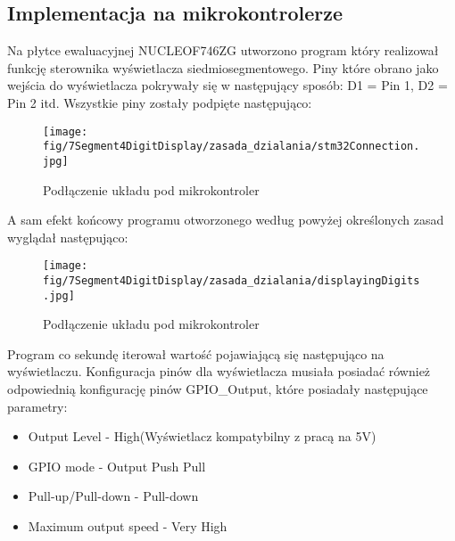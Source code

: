 \documentclass[11pt, a4paper]{article}
\begin{document}
\subsection{Implementacja na mikrokontrolerze}
Na płytce ewaluacyjnej NUCLEOF746ZG utworzono program który realizował funkcję sterownika wyświetlacza siedmiosegmentowego. Piny które obrano jako wejścia do wyświetlacza pokrywały się w następujący sposób: D1 = Pin 1, D2 = Pin 2 itd. Wszystkie piny zostały podpięte następująco:
\begin{figure}[H]
    \centering
    \texttt{[image: fig/7Segment4DigitDisplay/zasada\_dzialania/stm32Connection.jpg]}
    \caption{Podłączenie układu pod mikrokontroler}
\end{figure}
A sam efekt końcowy programu otworzonego według powyżej określonych zasad wyglądał następująco:
\begin{figure}[H]
    \centering
    \texttt{[image: fig/7Segment4DigitDisplay/zasada\_dzialania/displayingDigits.jpg]}
    \caption{Podłączenie układu pod mikrokontroler}
\end{figure}
Program co sekundę iterował wartość pojawiającą się następująco na wyświetlaczu. Konfiguracja pinów dla wyświetlacza musiała posiadać również odpowiednią konfigurację pinów GPIO\_Output, które posiadały następujące parametry:
\begin{itemize}
    \item Output Level - High(Wyświetlacz kompatybilny z pracą na 5V)
    \item GPIO mode - Output Push Pull
    \item Pull-up/Pull-down - Pull-down
    \item Maximum output speed - Very High
\end{itemize}

\newpage
\printbibliography[heading=bibintoc]
\end{document}

